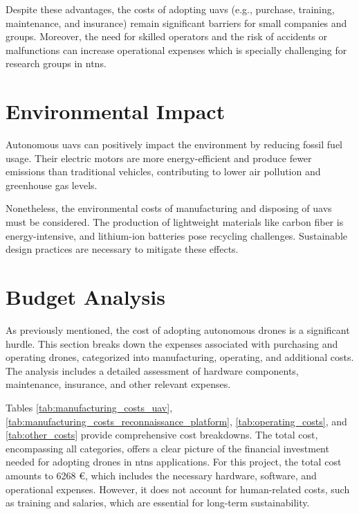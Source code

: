 Despite these advantages, the costs of adopting \glspl{uav} (e.g., purchase, training, maintenance, and insurance) remain significant barriers for small companies and groups. Moreover, the need for skilled operators and the risk of accidents or malfunctions can increase operational expenses which is specially challenging for research groups in \glspl{ntn}.

\section{Environmental Impact}\label{sec:environmental_impact}

Autonomous \glspl{uav} can positively impact the environment by reducing fossil fuel usage. Their electric motors are more energy-efficient and produce fewer emissions than traditional vehicles, contributing to lower air pollution and greenhouse gas levels.

Nonetheless, the environmental costs of manufacturing and disposing of \glspl{uav} must be considered. The production of lightweight materials like carbon fiber is energy-intensive, and lithium-ion batteries pose recycling challenges. Sustainable design practices are necessary to mitigate these effects.

\section{Budget Analysis}\label{sec:budget_analysis}

As previously mentioned, the cost of adopting autonomous drones is a significant hurdle. This section breaks down the expenses associated with purchasing and operating drones, categorized into manufacturing, operating, and additional costs. The analysis includes a detailed assessment of hardware components, maintenance, insurance, and other relevant expenses.

Tables \cref{tab:manufacturing_costs_uav}, \cref{tab:manufacturing_costs_reconnaissance_platform}, \cref{tab:operating_costs}, and \cref{tab:other_costs} provide comprehensive cost breakdowns. The total cost, encompassing all categories, offers a clear picture of the financial investment needed for adopting drones in \glspl{ntn} applications. For this project, the total cost amounts to 6268 \euro, which includes the necessary hardware, software, and operational expenses. However, it does not account for human-related costs, such as training and salaries, which are essential for long-term sustainability.


